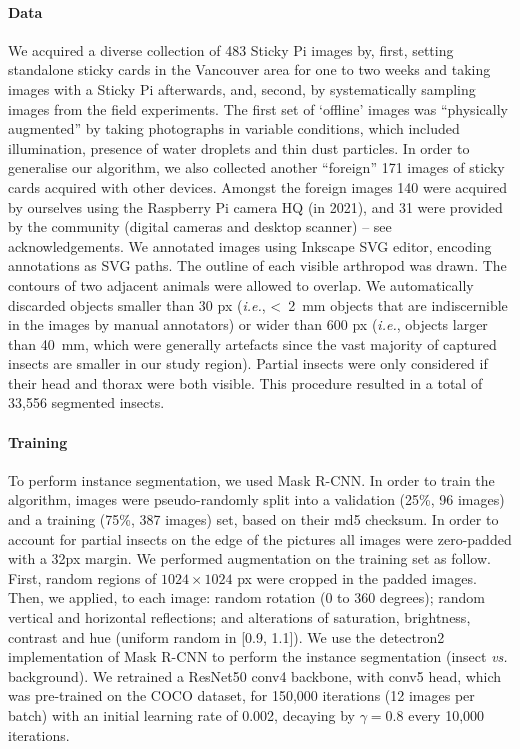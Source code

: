 \documentclass[12pt]{article}
\begin{document}
\begin{linenumbers}
		\paragraph{Data}
		We acquired a diverse collection of 483 Sticky Pi images by, first, setting standalone sticky cards in the Vancouver area for one to two weeks and taking images with a Sticky Pi afterwards, and, second, by systematically sampling images from the field experiments. The first set of ‘offline’ images was “physically augmented” by taking photographs in variable conditions, which included illumination, presence of water droplets and thin dust particles. 
		In order to generalise our algorithm, we also collected another ``foreign'' 171 images of sticky cards acquired with other devices. Amongst the foreign images 140 were acquired by ourselves using the Raspberry Pi camera HQ (in 2021), and 31 were provided by the community (digital cameras and desktop scanner) -- see acknowledgements. 
		We annotated images using Inkscape SVG editor, encoding annotations as SVG paths. The outline of each visible arthropod was drawn. The contours of two adjacent animals were allowed to overlap. We automatically discarded objects smaller than 30 px (\emph{i.e.}, <~2~mm objects that are indiscernible in the images by manual annotators) or wider than 600 px (\emph{i.e.}, objects larger than 40~mm, which were generally artefacts since the vast majority of captured insects are smaller in our study region). Partial insects were only considered if their head and thorax were both visible. This procedure resulted in a total of 
		33,556
		segmented insects.

		\paragraph{Training}
		To perform instance segmentation, we used Mask R-CNN\cite{he_mask_2017}. In order to train the algorithm, images were pseudo-randomly split into a validation (25\%, 96 images) and a training (75\%, 387 images) set, based on their md5 checksum.
		In order to account for partial insects on the edge of the pictures all images were zero-padded with a 32px margin.
		We performed augmentation on the training set as follow. 
		First, random regions of $1024 \times{} 1024$ px were cropped in the padded images.
		Then, we applied, to each image: random rotation (0 to 360 degrees); random vertical and horizontal reflections; and alterations of saturation, brightness, contrast and hue (uniform random in [0.9, 1.1]). 
		We use the detectron2 implementation \cite{wu_detectron2_2019} of Mask R-CNN to perform the instance segmentation (insect \emph{vs.} background). We retrained a ResNet50 conv4 backbone, with conv5 head, which was pre-trained on the COCO dataset, 
		for 150,000 iterations 
		(12 images per batch) with an initial learning rate of 0.002, decaying by $\gamma=0.8$ every 10,000 iterations.


\end{linenumbers}
\end{document}
